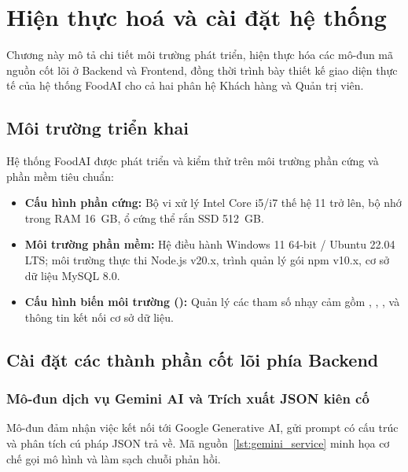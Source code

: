 \chapter{Hiện thực hoá và cài đặt hệ thống}
\label{ch:caidat}

\begin{muctieu}
Chương này mô tả chi tiết môi trường phát triển, hiện thực hóa các mô-đun mã nguồn cốt lõi ở Backend và Frontend, đồng thời trình bày thiết kế giao diện thực tế của hệ thống FoodAI cho cả hai phân hệ Khách hàng và Quản trị viên.
\end{muctieu}

\section{Môi trường triển khai}

Hệ thống FoodAI được phát triển và kiểm thử trên môi trường phần cứng và phần mềm tiêu chuẩn:
\begin{itemize}[leftmargin=1.6em, itemsep=2pt]
  \item \textbf{Cấu hình phần cứng:} Bộ vi xử lý Intel Core i5/i7 thế hệ 11 trở lên, bộ nhớ trong RAM 16~GB, ổ cứng thể rắn SSD 512~GB.
  \item \textbf{Môi trường phần mềm:} Hệ điều hành Windows 11 64-bit / Ubuntu 22.04 LTS; môi trường thực thi Node.js v20.x, trình quản lý gói npm v10.x, cơ sở dữ liệu MySQL 8.0.
  \item \textbf{Cấu hình biến môi trường ():} Quản lý các tham số nhạy cảm gồm , , ,  và thông tin kết nối cơ sở dữ liệu.
\end{itemize}

\section{Cài đặt các thành phần cốt lõi phía Backend}

\subsection{Mô-đun dịch vụ Gemini AI và Trích xuất JSON kiên cố}

Mô-đun  đảm nhận việc kết nối tới Google Generative AI, gửi prompt có cấu trúc và phân tích cú pháp JSON trả về. Mã nguồn~\ref{lst:gemini_service} minh họa cơ chế gọi mô hình và làm sạch chuỗi phản hồi.

